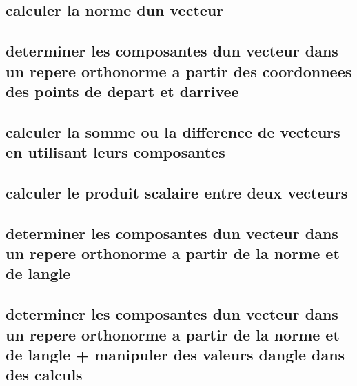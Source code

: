 \documentclass[11pt]{article}
\begin{document}
    \subsection{calculer la norme dun vecteur}
      
      
    \subsection{determiner les composantes dun vecteur dans un repere orthonorme a partir des coordonnees des points de depart et darrivee}
      
      
    \subsection{calculer la somme ou la difference de vecteurs en utilisant leurs composantes}
      
      
    \subsection{calculer le produit scalaire entre deux vecteurs}
      
      
    \subsection{determiner les composantes dun vecteur dans un repere orthonorme a partir de la norme et de langle}
      
    \subsection{determiner les composantes dun vecteur dans un repere orthonorme a partir de la norme et de langle + manipuler des valeurs dangle dans des calculs}
      
\end{document}
